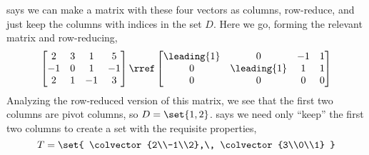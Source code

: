  says we can make a matrix with these four vectors as columns, row-reduce, and just keep the columns with indices in the set $D$.  Here we go, forming the relevant matrix and row-reducing,
%
\begin{equation*}
\begin{bmatrix}
 2 & 3 & 1 & 5 \\
 -1 & 0 & 1 & -1 \\
 2 & 1 & -1 & 3
\end{bmatrix}
\rref
\begin{bmatrix}
 \leading{1} & 0 & -1 & 1 \\
 0 & \leading{1} & 1 & 1 \\
 0 & 0 & 0 & 0
\end{bmatrix}
\end{equation*}
%
Analyzing the row-reduced version of this matrix, we see that the first two columns are pivot columns, so $D=\set{1,2}$.   says we need only ``keep'' the first two columns to create a set with the requisite properties,
%
\begin{equation*}
T=\set{
\colvector{2\\-1\\2},\,
\colvector{3\\0\\1}
}
\end{equation*}
%